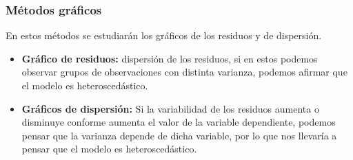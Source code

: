 \documentclass[a4paper,12pt]{article}
\begin{document}
\subsubsection{Métodos gráficos}
En estos métodos se estudiarán los gráficos de los residuos y de dispersión.

\begin{itemize}
    \item \textbf{Gráfico de residuos:} dispersión de los residuos, si en estos podemos observar grupos de observaciones con distinta varianza, podemos afirmar que el modelo es heteroscedástico.
    \item \textbf{Gráficos de dispersión:} Si la variabilidad de los residuos aumenta o disminuye conforme aumenta el valor de la variable dependiente, podemos pensar que la varianza depende de dicha variable, por lo que nos llevaría a pensar que el modelo es heteroscedástico.   
\end{itemize}
\end{document}
